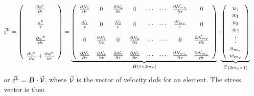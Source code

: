 \begin{equation}
\vec{\dot\varepsilon}^h=
\left(
\begin{array}{c}
\frac{\partial u^h}{\partial r} \\ \\
\frac{u^h}{r} \\ \\
\frac{\partial w^h}{\partial z} \\ \\
\frac{\partial u^h}{\partial z} + \frac{\partial w^h}{\partial r} 
\end{array}
\right)
=
\underbrace{
\left(
\begin{array}{ccccccccc}
\frac{\partial {\mathcal{N}}_1}{\partial r} &  0 &  
\frac{\partial {\mathcal{N}}_2}{\partial r} &  0 & 
\cdots & \cdots &
\frac{\partial {\mathcal{N}}_{m_\upnu}}{\partial r} &  0 
\\  \\
\frac{{\mathcal{N}}_1}{r}  & 0 &  
\frac{{\mathcal{N}}_2}{r}  & 0 & 
\cdots & \cdots &
\frac{{\mathcal{N}}_{m_\upnu}}{r}  & 0  
\\  \\
0 & \frac{\partial {\mathcal{N}}_1}{\partial z}  &
0 & \frac{\partial {\mathcal{N}}_2}{\partial z}  &  
\cdots & \cdots &
0 & \frac{\partial {\mathcal{N}}_{m_\upnu}}{\partial z}   
\\ \\
\frac{\partial {\mathcal{N}}_1}{\partial z} & \frac{\partial {\mathcal{N}}_1}{\partial r}  &
\frac{\partial {\mathcal{N}}_2}{\partial z} & \frac{\partial {\mathcal{N}}_2}{\partial r}  & \cdots & \cdots &
\frac{\partial {\mathcal{N}}_{m_\upnu}}{\partial z} & \frac{\partial {\mathcal{N}}_{m_\upnu}}{\partial r}  
\end{array}
\right)
}_{\bm B (4\times 2 m_\upnu) }
\cdot
\underbrace{
\left(
\begin{array}{c}
u_1 \\  w_1 \\ u_2 \\  w_2  \\ \vdots \\ u_{m_\upnu} \\ w_{m_\upnu} 
\end{array}
\right)
}_{\vec V ( 2m_\upnu \times1)}
\end{equation}
or $\vec{\dot{\varepsilon}}^h= {\bm B} \cdot \vec{\cal V}$, where $\vec{\cal V}$ is the vector 
of velocity dofs for an element.
The stress vector is then 
